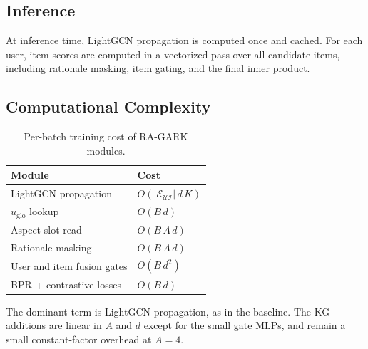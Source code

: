 \subsection{Inference}
\label{sec:train-inference}

At inference time, LightGCN propagation is computed once and cached. For each user, item scores are computed in a vectorized pass over all candidate items, including rationale masking, item gating, and the final inner product.

\subsection{Computational Complexity}
\label{sec:train-complexity}

\begin{table}[!htbp]
\centering
\caption{Per-batch training cost of RA-GARK modules.}
\label{tab:complexity}
\begin{tabular}{ll}
\toprule
Module & Cost \\
\midrule
LightGCN propagation       & $O(|\mathcal{E}_{\mathcal{U}\mathcal{I}}|\, d\, K)$ \\
$u_{\mathrm{glo}}$ lookup  & $O(B\, d)$ \\
Aspect-slot read           & $O(B\, A\, d)$ \\
Rationale masking          & $O(B\, A\, d)$ \\
User and item fusion gates & $O(B\, d^2)$ \\
BPR + contrastive losses   & $O(B\, d)$ \\
\bottomrule
\end{tabular}
\end{table}
\FloatBarrier

The dominant term is LightGCN propagation, as in the baseline. The KG additions are linear in $A$ and $d$ except for the small gate MLPs, and remain a small constant-factor overhead at $A=4$.

